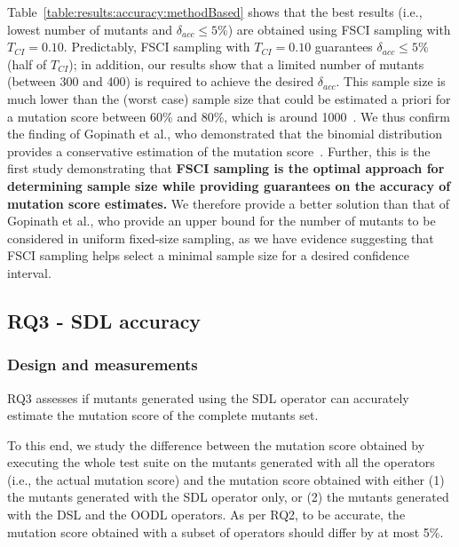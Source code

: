 Table~\ref{table:results:accuracy:methodBased}  shows that the best results (i.e., lowest number of mutants and $\delta_{acc} \le 5\%$) are obtained using  FSCI sampling with $T_\mathit{CI}=0.10$. Predictably, FSCI sampling with $T_\mathit{CI}=0.10$ guarantees $\delta_{acc} \le 5\%$ (half of $T_\mathit{CI}$); in addition, our results show that a limited number of mutants (between 300 and 400) is required to achieve the desired $\delta_{acc}$. This sample size is much lower than the (worst case) sample size that could be estimated a priori for a mutation score between 60\% and 80\%, which is around 1000~\cite{Goncalves2012}. We thus confirm the finding of Gopinath et al., who demonstrated that the binomial distribution provides a conservative estimation of the mutation score~\cite{gopinath2015hard}.
Further, this is the first study demonstrating that \textbf{FSCI sampling is the optimal approach for determining sample size while providing guarantees on the accuracy of mutation score estimates.} 
We therefore provide a better solution than that of Gopinath et al., who provide an upper bound for the number of mutants to be considered in uniform fixed-size sampling, as we have evidence suggesting that FSCI sampling helps select a minimal sample size for a desired confidence interval.





%
%



\subsection{RQ3 - SDL accuracy}



\subsubsection*{Design and measurements}


RQ3 assesses if mutants generated using the SDL operator can accurately estimate the mutation score of the complete mutants set.

To this end, we study the difference between the mutation score obtained by executing the whole test suite on the mutants generated with all the operators (i.e., the actual mutation score) and the mutation score obtained with either (1) the mutants generated with the SDL operator only, or (2) the mutants generated with the DSL and the OODL operators.
As per RQ2, to be accurate, the mutation score obtained with a subset of operators should differ by at most 5\%.

